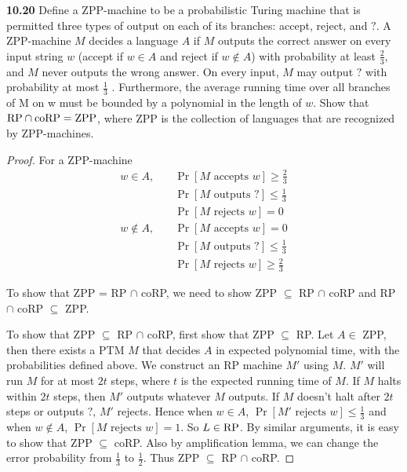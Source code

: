 \textbf{10.20} Define a ZPP-machine to be a probabilistic Turing machine that is permitted three types of output on each of its branches: accept, reject, and $?$. A ZPP-machine $M$ decides a language $A$ if $M$ outputs the correct answer on every input string $w$ (accept if $w \in A$ and reject if $w \not \in A$) with probability at least $\frac{2}{3}$, and $M$ never
outputs the wrong answer. On every input, $M$ may output $?$ with probability at most $\frac{1}{3}$ . Furthermore, the average running time over all branches of M on w must be bounded by a polynomial in the length of $w$. Show that $\text{RP} \cap \text{coRP} = \text{ZPP}$, where ZPP is the collection of languages that are recognized by ZPP-machines.

\begin{mdframed}
\begin{proof}
For a ZPP-machine
\begin{align*}
w \in A, & \quad \Pr[M \text{ accepts } w] \geq \frac{2}{3} \\
         & \quad \Pr[M \text{ outputs } ?] \leq \frac{1}{3} \\
         & \quad \Pr[M \text{ rejects } w] = 0 \\
w \not \in A, & \quad \Pr[M \text{ accepts } w] = 0  \\
         & \quad \Pr[M \text{ outputs } ?] \leq \frac{1}{3} \\
         & \quad \Pr[M \text{ rejects } w] \geq \frac{2}{3}
\end{align*}

To show that ZPP = RP $\cap$ coRP, we need to show ZPP $\subseteq$ RP $\cap$ coRP and RP $\cap$ coRP $\subseteq$ ZPP. 

\medskip
To show that ZPP $\subseteq$ RP $\cap$ coRP, first show that ZPP $\subseteq$ RP. Let $A \in$ ZPP, then there exists a PTM $M$ that decides $A$ in expected polynomial time, with the probabilities defined above. We construct an RP machine $M'$ using $M$. $M'$ will run $M$ for at most $2t$ steps, where $t$ is the expected running time of $M$. If $M$ halts within $2t$ steps, then $M'$ outputs whatever $M$ outputs. If $M$ doesn't halt after $2t$ steps or outputs $?$, $M'$ rejects. Hence when $w \in A$, $\Pr[M' \text{ rejects } w] \leq \frac{1}{3}$ and when $w \not \in A$, $\Pr[M \text{ rejects } w] = 1$. So $L \in \text{RP}$. By similar arguments, it is easy to show that ZPP $\subseteq$ coRP. Also by amplification lemma, we can change the error probability from $\frac{1}{3}$ to $\frac{1}{2}$. Thus ZPP $\subseteq$ RP $\cap$ coRP.


\end{proof}
\end{mdframed}

